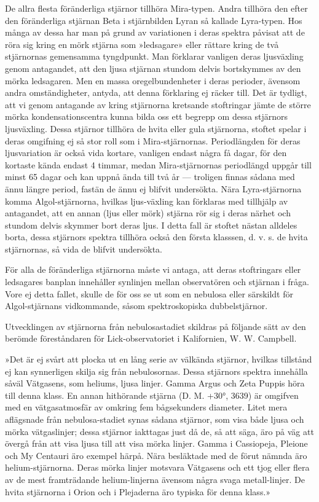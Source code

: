\documentclass[a4paper, 12pt, oneside, swedish]{article}
\begin{document}
De allra flesta föränderliga stjärnor tillhöra Mira-typen. Andra tillhöra den efter den föränderliga stjärnan Beta i stjärnbilden Lyran så kallade Lyra-typen. Hos många av dessa har man på grund av variationen i deras spektra påvisat att de röra sig kring en mörk stjärna som »ledsagare» eller rättare kring de två stjärnornas gemensamma tyngdpunkt. Man förklarar vanligen deras ljusväxling genom antagandet, att den ljusa stjärnan stundom delvis bortskymmes av den mörka ledsagaren. Men en massa oregelbundenheter i deras perioder, ävensom andra omständigheter, antyda, att denna förklaring ej räcker till. Det är tydligt, att vi genom antagande av kring stjärnorna kretsande stoftringar jämte de större mörka kondensationscentra kunna bilda oss ett begrepp om dessa stjärnors ljusväxling. Dessa stjärnor tillhöra de hvita eller gula stjärnorna, stoftet spelar i deras omgifning ej så stor roll som i Mira-stjärnornas. Periodlängden för deras ljusvariation är också vida kortare, vanligen endast några få dagar, för den kortaste kända endast 4 timmar, medan Mira-stjärnornas periodlängd uppgår till minst 65 dagar och kan uppnå ända till två år --- troligen finnas sådana med ännu längre period, fastän de ännu ej blifvit undersökta. Nära Lyra-stjärnorna komma Algol-stjärnorna, hvilkas ljus-växling kan förklaras med tillhjälp av antagandet, att en annan (ljus eller mörk) stjärna rör sig i deras närhet och stundom delvis skymmer bort deras ljus. I detta fall är stoftet nästan alldeles borta, dessa stjärnors spektra tillhöra också den första klasssen, d. v. s. de hvita stjärnornas, så vida de blifvit undersökta.

För alla de föränderliga stjärnorna måste vi antaga, att deras stoftringars eller ledsagares banplan innehåller synlinjen mellan observatören och stjärnan i fråga. Vore ej detta fallet, skulle de för oss se ut som en nebulosa eller särskildt för Algol-stjärnans vidkommande, såsom spektroskopiska dubbelstjärnor.

Utvecklingen av stjärnorna från nebulosastadiet skildras på följande sätt av den berömde föreståndaren för Lick-observatoriet i Kalifornien, W. W. Campbell.

»Det är ej svårt att plocka ut en lång serie av välkända stjärnor, hvilkas tillstånd ej kan synnerligen skilja sig från nebulosornas. Dessa stjärnors spektra innehålla såväl Vätgasens, som heliums, ljusa linjer. Gamma Argus och Zeta Puppis höra till denna klass. En annan hithörande stjärna (D. M. +30°, 3639) är omgifven med en vätgasatmosfär av omkring fem bågsekunders diameter. Litet mera aflägsnade från nebulosa-stadiet synas sådana stjärnor, som visa både ljusa och mörka vätgaslinjer; dessa stjärnor iakttagas just då de, så att säga, äro på väg att övergå från att visa ljusa till att visa mörka linjer. Gamma i Cassiopeja, Pleione och My Centauri äro exempel härpå. Nära besläktade med de förut nämnda äro helium-stjärnorna. Deras mörka linjer motsvara Vätgasens och ett tjog eller flera av de mest framträdande helium-linjerna ävensom några svaga metall-linjer. De hvita stjärnorna i Orion och i Plejaderna äro typiska för denna klass.»
\end{document}
